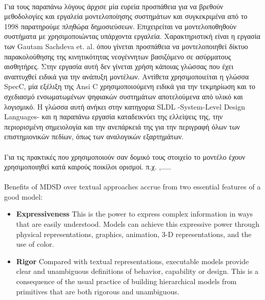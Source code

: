 \documentclass[a4paper,12pt,twoside]{report}
\begin{document}
			
						
			\paragraph{} {Για τους παραπάνω λόγους άρχισε μία ευρεία προσπάθεια για να βρεθούν μεθοδολογίες και εργαλεία μοντελοποίησης συστημάτων και συγκεκριμένα από το 1998 παρατηρούμε πληθώρα δημοσιεύσεων. Επιχειρείται να μοντελοποθηθούν συστήματα με χρησιμοποιώντας υπάρχοντα εργαλεία. Χαρακτηριστική είναι η εργασία των Gautam Sachdeva et. al. \cite{SMWirelessSensorNetwork} όπου γίνεται προσπάθεια να μοντελοποιηθεί δίκτυο παρακολούθησης της κινητικότητας νεογέννητων βασιζόμενο σε ασύρματους αισθητήρες. Στην εργασία αυτή δεν γίνεται χρήση κάποιας γλώσσας που έχει αναπτυχθεί ειδικά για την ανάπυξη μοντέλων. Αντίθετα χρησιμοποιείται η γλώσσα SpecC, μία εξέλιξη της Ansi C χρησιμοποιούμενη ειδικά για την τεκμηρίωση και το σχεδιασμό ενσωματωμένων ψηφιακών συστημάτων αποτελούμενα από υλικό και λογισμικό. Η γλώσσα αυτή ανήκει στην κατηγορια SLDL -System-Level Design Languages- και η παραπάνω εργασία καταδεικνύει της ελλείψεις της, την περιορισμένη σημειολογία και την ανεπάρκειά της για την περιγραφή όλων των επιστημιονικών πεδίων, όπως των αναλογικών εξαρτημάτων.
			}
			
			\paragraph{} {Για τις πρακτικές που χρησιμοποιούν σαν δομικό τους στοιχείο το μοντέλο έχουν χρησιμοποιηθεί κατά καιρούς ποικίλοι ορισμοί. π.χ.  \cite{FoundationalConceptsMDSD},.....
			}
			
			\paragraph{} {Benefits of MDSD over textual approaches accrue from two essential features of a good model: \cite{FoundationalConceptsMDSD}}
			\begin{itemize}
				\item \textbf{Expressiveness} This is the power to express complex information in ways that are easily understood. Models can achieve this expressive power through physical representations, graphics, animation, 3-D representations, and the use of color. 
				\item \textbf{Rigor} Compared with textual representations, executable models provide clear and unambiguous definitions of behavior, capability or design. This is a consequence of the usual practice of building hierarchical models from primitives that are both rigorous and unambiguous.
			\end{itemize}
			
\end{document}
